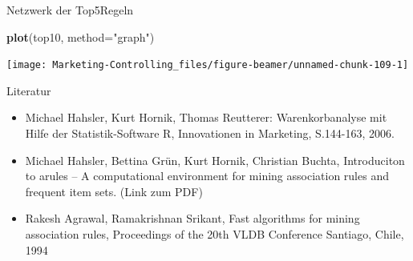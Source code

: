 \documentclass[12pt,ngerman,a4paper,ignorenonframetext,]{beamer}
\newenvironment{Shaded}{\begin{snugshade}}{\end{snugshade}}
\newcommand{\DataTypeTok}[1]{\textcolor[rgb]{0.13,0.29,0.53}{#1}}
\newcommand{\KeywordTok}[1]{\textcolor[rgb]{0.13,0.29,0.53}{\textbf{#1}}}
\newcommand{\NormalTok}[1]{#1}
\newcommand{\StringTok}[1]{\textcolor[rgb]{0.31,0.60,0.02}{#1}}
\providecommand{\tightlist}{%
  \setlength{\itemsep}{0pt}\setlength{\parskip}{0pt}}
\begin{document}
\begin{frame}{Netzwerk der Top5Regeln}
\protect\hypertarget{netzwerk-der-top5regeln}{}

\begin{Shaded}
\begin{Highlighting}[]
\KeywordTok{plot}\NormalTok{(top10, }\DataTypeTok{method=}\StringTok{"graph"}\NormalTok{)}
\end{Highlighting}
\end{Shaded}

\begin{center}\texttt{[image: Marketing-Controlling\_files/figure-beamer/unnamed-chunk-109-1]} \end{center}

\end{frame}

\begin{frame}{Literatur}
\protect\hypertarget{literatur-5}{}

\begin{itemize}
\tightlist
\item
  Michael Hahsler, Kurt Hornik, Thomas Reutterer: Warenkorbanalyse mit
  Hilfe der Statistik-Software R, Innovationen in Marketing, S.144-163,
  2006.
\item
  Michael Hahsler, Bettina Grün, Kurt Hornik, Christian Buchta,
  Introduciton to arules -- A computational environment for mining
  association rules and frequent item sets. (Link zum PDF)
\item
  Rakesh Agrawal, Ramakrishnan Srikant, Fast algorithms for mining
  association rules, Proceedings of the 20th VLDB Conference Santiago,
  Chile, 1994
\end{itemize}

\end{frame}
\end{document}
